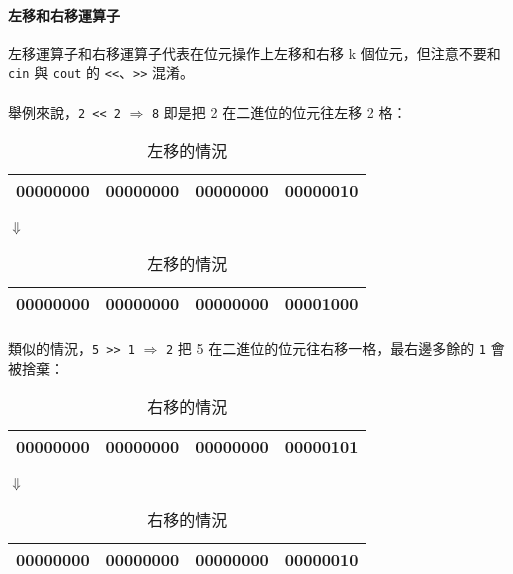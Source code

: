 \documentclass[12pt,a4paper,oneside]{article}
\begin{document}
\begin{CJK}{UTF8}{bkai}
\paragraph{左移和右移運算子}左移運算子和右移運算子代表在位元操作上左移和右移 k 個位元，但注意不要和 \lstinline!cin! 與 \lstinline!cout! 的 \lstinline!<<!、\lstinline!>>! 混淆。

\paragraph{}舉例來說，\lstinline!2 << 2!{ $\Rightarrow$ \lstinline!8!} 即是把 2 在二進位的位元往左移 2 格：

\begin{table}[h!]
\centering
\begin{tabular}{|c|c|c|c|}
\hline
00000000 & 00000000 & 00000000 & 000000{\color{red}10}\\
\hline
\end{tabular}
\begin{center}$\Downarrow$\end{center}
\begin{tabular}{|c|c|c|c|}
\hline
00000000 & 00000000 & 00000000 & 0000{\color{red}10}00\\
\hline
\end{tabular}
\caption{左移的情況}
\label{basic:cpp:table:left:shift}
\end{table}

\paragraph{}類似的情況，\lstinline!5 >> 1!{ $\Rightarrow$ \lstinline!2!} 把 5 在二進位的位元往右移一格，最右邊多餘的 \lstinline!1! 會被捨棄：

\begin{table}[h!]
\centering
\begin{tabular}{|c|c|c|c|}
\hline
00000000 & 00000000 & 00000000 & 00000{\color{red}101}\\
\hline
\end{tabular}
\begin{center}$\Downarrow$\end{center}
\begin{tabular}{|c|c|c|c|}
\hline
00000000 & 00000000 & 00000000 & 000000{\color{red}10}\\
\hline
\end{tabular}
\caption{右移的情況}
\label{basic:cpp:table:right:shift}
\end{table}


\end{CJK}
\end{document}
